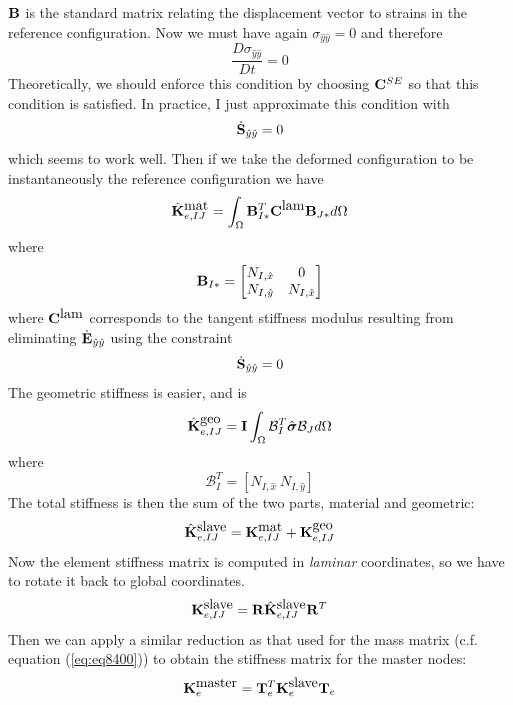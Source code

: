 \documentclass{article}
\begin{document}
${\bf B}$ is the standard matrix relating the displacement vector to strains in the reference configuration.
Now we must have again $\sigma_{\hat{y}\hat{y}} = 0$ and therefore 
\[ \frac{D\sigma_{\hat{y}\hat{y}}}{Dt} = 0 \]
Theoretically, we should enforce this condition by choosing ${\bf C}^{SE}$ so that this condition is satisfied.
In practice, I just approximate this condition with
\[ \dot{\bf S}_{\hat{y}\hat{y}} = 0 \]
which seems to work well.
Then if we take the deformed configuration to be instantaneously the reference configuration we have
\begin{equation}   \hat{{\bf K}}^{\mbox{mat}}_{e,IJ} = \int_{\Omega} {\bf B}_{I*}^T {\bf C}^{\mbox{lam}}   {\bf B}_{J*} d\Omega \label{eq:eq9100} \end{equation} 
where 
\begin{equation}   {\bf B}_{I*} = \begin{bmatrix}
N_{I, \hat{x}} & 0  \\
N_{I, \hat{y}} & N_{I, \hat{x}}
\end{bmatrix}  \label{eq:eq9200} \end{equation} 
where ${\bf C}^{\mbox{lam}}$ corresponds to the tangent stiffness modulus resulting from eliminating $\dot{\bf E}_{\hat{y}\hat{y}}$ using the constraint 
\[ \dot{\bf S}_{\hat{y}\hat{y}} = 0 \]
The geometric stiffness is easier, and is
\begin{equation}  \hat{\bf K}^{\mbox{geo}}_{e,IJ} = {\bf I}\int_{\Omega} { \mathcal{ B}}_{I}^T \hat{\boldsymbol \sigma} {\mathcal{B}_J} d\Omega \label{eq:eq9300} \end{equation} 
where 
\[ { \mathcal{ B}}_{I}^T = \left[ N_{I,\hat{x}} \ N_{I,\hat{y}} \right] \]
The total stiffness is then the sum of the two parts, material and geometric:
\[ \hat{{\bf K}}^{\mbox{slave}}_{e,IJ} =  {\bf K}^{\mbox{mat}}_{e,IJ} +  {\bf K}^{\mbox{geo}}_{e,IJ} \]
Now the element stiffness matrix is computed in \emph{laminar} coordinates, so we have to rotate it back to global coordinates.
\[ {\bf K}_{e,IJ}^{\mbox{slave}} = {\bf R} \hat{\bf K}_{e,IJ}^{\mbox{slave}} {\bf R}^T \]
Then we can apply a similar reduction as that used for the mass matrix (c.f. equation (\ref{eq:eq8400})) to obtain the stiffness matrix for the master nodes:
\begin{equation}  {\bf K}_e^{\mbox{master}} = {\bf T}_e^T {\bf K}^{\mbox{slave}}_e  {\bf T}_e  \label{eq:eq9400} \end{equation} 
\end{document}
